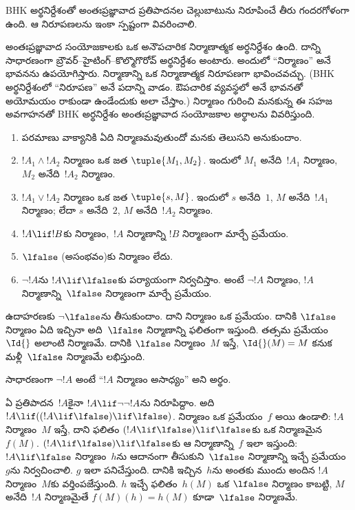 \documentclass[../../../include/open-logic-section]{subfiles}
\begin{document}


\begin{editorial}
  BHK అర్థనిర్దేశంతో అంతఃప్రజ్ఞావాద ప్రతిపాదనల
  చెల్లుబాటును నిరూపించే తీరు గందరగోళంగా ఉంది.
  ఆ నిరూపణలను ఇంకా స్పష్టంగా వివరించాలి.
\end{editorial}

అంతఃప్రజ్ఞావాద సంయోజకాలకు ఒక అనౌపచారిక
నిర్మాణాత్మక అర్థనిర్దేశం ఉంది. దాన్ని సాధారణంగా
బ్రౌవర్--హైటింగ్--కొల్మొగొరోవ్ అర్థనిర్దేశం
అంటారు. అందులో ``నిర్మాణం'' అనే భావనను ఉపయోగిస్తారు.
నిర్మాణాన్ని ఒక నిర్మాణాత్మక నిరూపణగా భావించవచ్చు.
(BHK అర్థనిర్దేశంలో ``నిరూపణ'' అనే పదాన్ని
వాడం. ఔపచారిక  వ్యవస్థలో
 అనే భావనతో
అయోమయం రాకుండా ఉండేందుకు అలా చేస్తాం.) నిర్మాణం గురించి
మనకున్న ఈ సహజ అవగాహనతో BHK అర్థనిర్దేశం
అంతఃప్రజ్ఞావాద సంయోజకాల అర్థాలను వివరిస్తుంది.

\begin{enumerate}
\item పరమాణు వాక్యానికి ఏది నిర్మాణమవుతుందో మనకు
  తెలుసని అనుకుందాం.
\item $!A_1 \land !A_2$ నిర్మాణం ఒక జత
  $\tuple{M_1, M_2}$. ఇందులో $M_1$ అనేది~$!A_1$
  నిర్మాణం, $M_2$ అనేది~$!A_2$ నిర్మాణం.
\item $!A_1 \lor !A_2$ నిర్మాణం ఒక జత $\tuple{s, M}$.
  ఇందులో $s$ అనేది~$1$, $M$ అనేది~$!A_1$
  నిర్మాణం; లేదా $s$ అనేది~$2$, $M$ అనేది~$!A_2$
  నిర్మాణం.
\item $!A \lif !B$కు నిర్మాణం,~$!A$ నిర్మాణాన్ని
  $!B$ నిర్మాణంగా మార్చే ప్రమేయం.
\item $\lfalse$ (అసంభవం)కు నిర్మాణం లేదు.
\item $\lnot !A$ను $!A \lif \lfalse$కు పర్యాయంగా
  నిర్వచిస్తాం. అంటే $\lnot !A$ నిర్మాణం,
  $!A$ నిర్మాణాన్ని~$\lfalse$ నిర్మాణంగా మార్చే
  ప్రమేయం.
\end{enumerate}

\begin{ex}
ఉదాహరణకు $\lnot \lfalse$ను తీసుకుందాం. దాని
నిర్మాణం ఒక ప్రమేయం. దానికి $\lfalse$ నిర్మాణం ఏది
ఇచ్చినా అది~$\lfalse$ నిర్మాణాన్ని ఫలితంగా ఇస్తుంది.
తత్సమ ప్రమేయం~$\Id{}$ అలాంటి నిర్మాణమే. దానికి $\lfalse$
నిర్మాణం~$M$ ఇస్తే, $\Id{}(M) = M$ కనుక
మళ్లీ~$\lfalse$ నిర్మాణమే లభిస్తుంది.
\end{ex}

సాధారణంగా $\lnot !A$ అంటే ``$!A$ నిర్మాణం
అసాధ్యం'' అని అర్థం.

\begin{ex}
ఏ ప్రతిపాదన~$!A$కైనా $!A \lif \lnot \lnot !A$ను
నిరూపిద్దాం. అది $!A \lif ((!A \lif \lfalse) \lif
\lfalse)$. నిర్మాణం ఒక ప్రమేయం~$f$ అయి ఉండాలి:
$!A$ నిర్మాణం~$M$ ఇస్తే, దాని ఫలితం $(!A \lif \lfalse)
\lif \lfalse$కు ఒక నిర్మాణమైన~$f(M)$.
$(!A \lif \lfalse) \lif
\lfalse$కు ఆ నిర్మాణాన్ని~$f$ ఇలా ఇస్తుంది:
$!A \lif \lfalse$ నిర్మాణం~$h$ను ఆదానంగా
తీసుకుని~$\lfalse$ నిర్మాణాన్ని ఇచ్చే ప్రమేయం
$g$ను నిర్వచించాలి. $g$ ఇలా పనిచేస్తుంది. దానికి ఇచ్చిన~$h$ను
అంతకు ముందు అందిన $!A$ నిర్మాణం~$M$కు వర్తింపజేస్తుంది. $h$ ఇచ్చే
ఫలితం~$h(M)$ ఒక $\lfalse$ నిర్మాణం కాబట్టి,
$M$ అనేది~$!A$ నిర్మాణమైతే $f(M)(h) = h(M)$
కూడా~$\lfalse$ నిర్మాణమే.
\end{ex}
\end{document}
